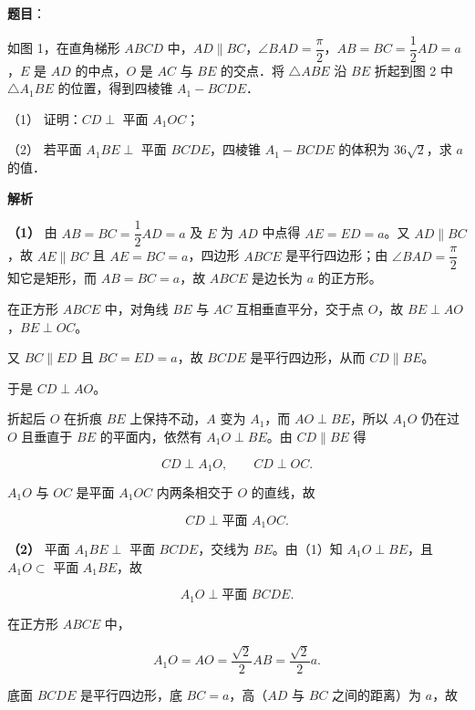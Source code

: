 \begin{answer}

\textbf{题目}：

如图 1，在直角梯形 $ABCD$ 中，$AD\parallel BC$，$\angle BAD=\dfrac{\pi}{2}$，$AB=BC=\dfrac{1}{2}AD=a$，$E$ 是 $AD$ 的中点，$O$ 是 $AC$ 与 $BE$ 的交点．将 $\triangle ABE$ 沿 $BE$ 折起到图 2 中 $\triangle A_{1}BE$ 的位置，得到四棱锥 $A_{1}-BCDE$．

（1） 证明：$CD\perp$ 平面 $A_{1}OC$；

（2） 若平面 $A_{1}BE\perp$ 平面 $BCDE$，四棱锥 $A_{1}-BCDE$ 的体积为 $36\sqrt{2}$，求 $a$ 的值．
\nopagebreak[4]
\begin{center}\end{center}
\nopagebreak[4]
\textbf{解析}

\textbf{（1）} 由 $AB=BC=\dfrac{1}{2}AD=a$ 及 $E$ 为 $AD$ 中点得 $AE=ED=a$。又 $AD\parallel BC$，故 $AE\parallel BC$ 且 $AE=BC=a$，四边形 $ABCE$ 是平行四边形；由 $\angle BAD=\dfrac{\pi}{2}$ 知它是矩形，而 $AB=BC=a$，故 $ABCE$ 是边长为 $a$ 的正方形。

在正方形 $ABCE$ 中，对角线 $BE$ 与 $AC$ 互相垂直平分，交于点 $O$，故 $BE\perp AO$，$BE\perp OC$。

又 $BC\parallel ED$ 且 $BC=ED=a$，故 $BCDE$ 是平行四边形，从而 $CD\parallel BE$。

于是 $CD\perp AO$。

折起后 $O$ 在折痕 $BE$ 上保持不动，$A$ 变为 $A_{1}$，而 $AO\perp BE$，所以 $A_{1}O$ 仍在过 $O$ 且垂直于 $BE$ 的平面内，依然有 $A_{1}O\perp BE$。由 $CD\parallel BE$ 得

\nopagebreak[4]
\[
CD\perp A_{1}O,\qquad CD\perp OC.
\]

$A_{1}O$ 与 $OC$ 是平面 $A_{1}OC$ 内两条相交于 $O$ 的直线，故

\nopagebreak[4]
\[
CD\perp \text{平面 }A_{1}OC.
\]

\textbf{（2）} 平面 $A_{1}BE\perp$ 平面 $BCDE$，交线为 $BE$。由（1）知 $A_{1}O\perp BE$，且 $A_{1}O\subset$ 平面 $A_{1}BE$，故

\nopagebreak[4]
\[
A_{1}O\perp \text{平面 }BCDE.
\]

在正方形 $ABCE$ 中，

\nopagebreak[4]
\[
A_{1}O=AO=\frac{\sqrt{2}}{2}AB=\frac{\sqrt{2}}{2}a.
\]

底面 $BCDE$ 是平行四边形，底 $BC=a$，高（$AD$ 与 $BC$ 之间的距离）为 $a$，故


\end{answer}
